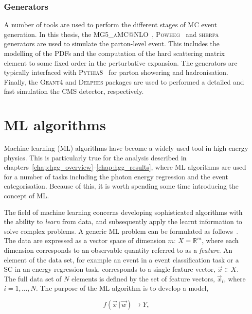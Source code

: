 \subsubsection{Generators}
A number of tools are used to perform the different stages of MC event generation. In this thesis, the \textsc{MG5\_aMC@NLO}~\cite{Alwall:2014hca}, \textsc{Powheg}~\cite{Nason:2004rx,Frixione:2007vw,Alioli:2008tz,Nason:2009ai,Alioli:2010xd,Hartanto:2015uka} and \textsc{sherpa}~\cite{Gleisberg:2008ta} generators are used to simulate the parton-level event. This includes the modelling of the PDFs and the computation of the hard scattering matrix element to some fixed order in the perturbative expansion. The generators are typically interfaced with \textsc{Pythia8}~\cite{Sjostrand:2014zea} for parton showering and hadronisation. Finally, the \textsc{Geant4} and \textsc{Delphes} packages are used to performed a detailed and fast simulation the CMS detector, respectively.

\section{ML algorithms}\label{sec:ml_algo}
Machine learning (ML) algorithms have become a widely used tool in high energy physics. This is particularly true for the \Hgg analysis described in chapters~\ref{chap:hgg_overview}--\ref{chap:hgg_results}, where ML algorithms are used for a number of tasks including the photon energy regression and the event categorisation. Because of this, it is worth spending some time introducing the concept of ML. 

The field of machine learning concerns developing sophisticated algorithms with the ability to \textit{learn} from data, and subsequently apply the learnt information to solve complex problems. A generic ML problem can be formulated as follows~\cite{hastie01statisticallearning}. The data are expressed as a vector space of dimension $m$: $X = \mathbb{R}^m$, where each dimension corresponds to an observable quantity referred to as a \textit{feature}. An element of the data set, for example an event in a event classification task or a SC in an energy regression task, corresponds to a single feature vector, $\vec{x} \in X$. The full data set of $N$ elements is defined by the set of feature vectors, $\vec{x}_i$, where $i=1,...,N$. The purpose of the ML algorithm is to develop a model,

\begin{equation}
    f(\vec{x}\,|\,\vec{w}) \rightarrow Y,
\end{equation}

